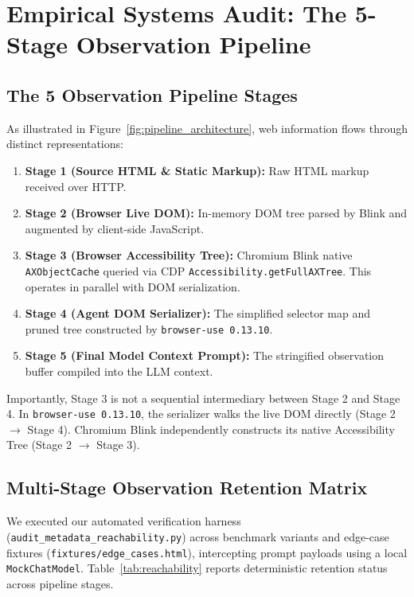 \documentclass[11pt,a4paper]{article}
\begin{document}


\section{Empirical Systems Audit: The 5-Stage Observation Pipeline}
\label{sec:audit}

\subsection{The 5 Observation Pipeline Stages}
As illustrated in Figure~\ref{fig:pipeline_architecture}, web information flows through distinct representations:
\begin{enumerate}
    \item \textbf{Stage 1 (Source HTML \& Static Markup):} Raw HTML markup received over HTTP.
    \item \textbf{Stage 2 (Browser Live DOM):} In-memory DOM tree parsed by Blink and augmented by client-side JavaScript.
    \item \textbf{Stage 3 (Browser Accessibility Tree):} Chromium Blink native \texttt{AXObjectCache} queried via CDP \texttt{Accessibility.getFullAXTree}. This operates in parallel with DOM serialization.
    \item \textbf{Stage 4 (Agent DOM Serializer):} The simplified selector map and pruned tree constructed by \texttt{browser-use 0.13.10}.
    \item \textbf{Stage 5 (Final Model Context Prompt):} The stringified observation buffer compiled into the LLM context.
\end{enumerate}

Importantly, Stage 3 is not a sequential intermediary between Stage 2 and Stage 4. In \texttt{browser-use 0.13.10}, the serializer walks the live DOM directly (Stage 2 $\to$ Stage 4). Chromium Blink independently constructs its native Accessibility Tree (Stage 2 $\to$ Stage 3).

\subsection{Multi-Stage Observation Retention Matrix}
We executed our automated verification harness (\texttt{audit\_metadata\_reachability.py}) across benchmark variants and edge-case fixtures (\texttt{fixtures/edge\_cases.html}), intercepting prompt payloads using a local \texttt{MockChatModel}. Table~\ref{tab:reachability} reports deterministic retention status across pipeline stages.
\end{document}

